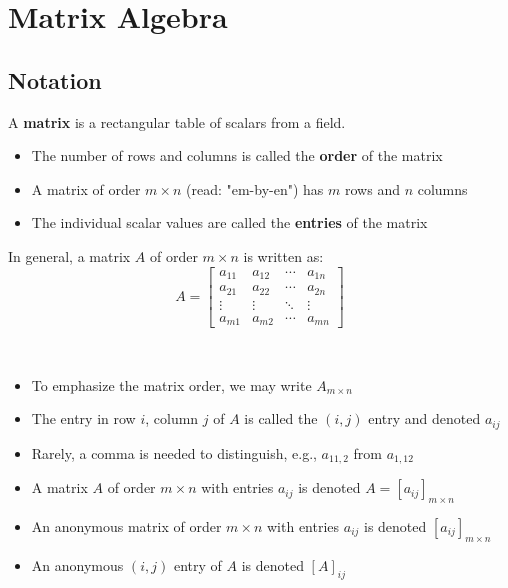 \chapter{Matrix Algebra}
\section{Notation}

\begin{definition}[Matrix]\label{def:matrix}
    A \textbf{matrix} is a rectangular table of scalars from a field.
    \begin{itemize}
        \item The number of rows and columns is called the \textbf{order} of the matrix
        \item A matrix of order $m \times n$ (read: "em-by-en") has $m$ rows and $n$ columns
        \item The individual scalar values are called the \textbf{entries} of the matrix
    \end{itemize}
\end{definition}

In general, a matrix $A$ of order $m \times n$ is written as:
\[
A = \begin{bmatrix}
    a_{11} & a_{12} & \cdots & a_{1n} \\
    a_{21} & a_{22} & \cdots & a_{2n} \\
    \vdots & \vdots & \ddots & \vdots \\
    a_{m1} & a_{m2} & \cdots & a_{mn}
\end{bmatrix}
\]

\begin{notation}\
    \begin{itemize}
        \item To emphasize the matrix order, we may write $A_{m \times n}$
        \item The entry in row $i$, column $j$ of $A$ is called the $(i,j)$ entry and denoted $a_{ij}$
        \item Rarely, a comma is needed to distinguish, e.g., $a_{11,2}$ from $a_{1,12}$
        \item A matrix $A$ of order $m \times n$ with entries $a_{ij}$ is denoted $A = [a_{ij}]_{m \times n}$
        \item An anonymous matrix of order $m \times n$ with entries $a_{ij}$ is denoted $[a_{ij}]_{m \times n}$
        \item An anonymous $(i,j)$ entry of $A$ is denoted $[A]_{ij}$
    \end{itemize}
\end{notation}

